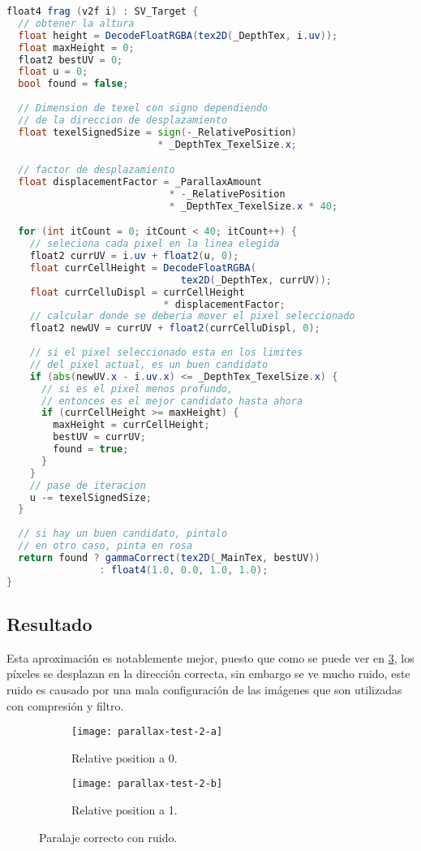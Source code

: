 \begin{lstlisting}[language=glsl]
float4 frag (v2f i) : SV_Target {
  // obtener la altura
  float height = DecodeFloatRGBA(tex2D(_DepthTex, i.uv));
  float maxHeight = 0;
  float2 bestUV = 0;
  float u = 0;
  bool found = false;
    
  // Dimension de texel con signo dependiendo
  // de la direccion de desplazamiento
  float texelSignedSize = sign(-_RelativePosition) 
                          * _DepthTex_TexelSize.x;

  // factor de desplazamiento
  float displacementFactor = _ParallaxAmount 
                            * -_RelativePosition 
                            * _DepthTex_TexelSize.x * 40;

  for (int itCount = 0; itCount < 40; itCount++) {
    // seleciona cada pixel en la linea elegida
    float2 currUV = i.uv + float2(u, 0);
    float currCellHeight = DecodeFloatRGBA(
                              tex2D(_DepthTex, currUV));
    float currCelluDispl = currCellHeight 
                           * displacementFactor;
    // calcular donde se deberia mover el pixel seleccionado
    float2 newUV = currUV + float2(currCelluDispl, 0);
        
    // si el pixel seleccionado esta en los limites 
    // del pixel actual, es un buen candidato
    if (abs(newUV.x - i.uv.x) <= _DepthTex_TexelSize.x) {
      // si es el pixel menos profundo, 
      // entonces es el mejor candidato hasta ahora
      if (currCellHeight >= maxHeight) {
        maxHeight = currCellHeight;
        bestUV = currUV;
        found = true;
      }
    }
    // pase de iteracion
    u -= texelSignedSize;
  }
    
  // si hay un buen candidato, pintalo
  // en otro caso, pinta en rosa
  return found ? gammaCorrect(tex2D(_MainTex, bestUV)) 
                : float4(1.0, 0.0, 1.0, 1.0);
}
\end{lstlisting}

\subsection{Resultado}
Esta aproximación es notablemente mejor, puesto que como se puede ver en \ref{fig:parallax-test-2}, los píxeles se desplazan en la dirección correcta, sin embargo se ve mucho ruido, este ruido es causado por una mala configuración de las imágenes que son utilizadas con compresión y filtro.

\begin{figure}[H]
\centering
\begin{subfigure}{.47\linewidth}
	\centering
  \texttt{[image: parallax-test-2-a]}
  \caption{Relative position a 0.}
  \label{fig:parallax-test-2-a}
\end{subfigure}%
\hspace{.05\linewidth}
\begin{subfigure}{.47\linewidth}
	\centering
  \texttt{[image: parallax-test-2-b]}
  \caption{Relative position a 1.}
  \label{fig:parallax-test-2-b}
\end{subfigure}
\caption{Paralaje correcto con ruido.}
\label{fig:parallax-test-2}
\end{figure}
\FloatBarrier

